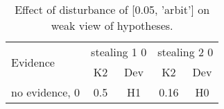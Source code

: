 \begin{table}\begin{tabular}{l|cc|cc}\toprule\multirow{2}{*}{Evidence} & \multicolumn{2}{c}{stealing 1 0}& \multicolumn{2}{c}{stealing 2 0}\\& {K2} & {Dev}& {K2} & {Dev}\\\midrule
no evidence, 0 & \cellcolor{Bittersweet}0.5&\cellcolor{Bittersweet}H1&\cellcolor{Bittersweet}0.16&\cellcolor{Bittersweet}H0\\\bottomrule\end{tabular}\caption{Effect of disturbance of [0.05, 'arbit'] on weak view of hypotheses.}\end{table}